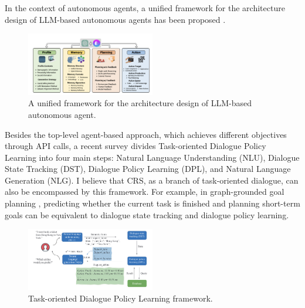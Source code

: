 \documentclass[11pt]{article}
\begin{document}
In the context of autonomous agents, a unified framework for the architecture design of LLM-based autonomous agents has been proposed \cite{wang2023survey}.
\begin{figure}[ht]
\centering
\includegraphics[width=0.5\textwidth]{images/image-20231224152952795.png}
\caption{A unified framework for the architecture design of LLM-based autonomous agent. \cite{wang2023survey}}
\end{figure}



Besides the top-level agent-based approach, which achieves different objectives through API calls, a recent survey \cite{kwanSurveyRecentAdvances2023} divides Task-oriented Dialogue Policy Learning into four main steps: Natural Language Understanding (NLU), Dialogue State Tracking (DST), Dialogue Policy Learning (DPL), and Natural Language Generation (NLG). I believe that CRS, as a branch of task-oriented dialogue, can also be encompassed by this framework. For example, in graph-grounded goal planning \citet{liuGraphGroundedGoalPlanning2022}, predicting whether the current task is finished and planning short-term goals can be equivalent to dialogue state tracking and dialogue policy learning.
\begin{figure}[ht]
\centering
\includegraphics[width=0.5\textwidth]{images/image-20231224150925950.png}
\caption{Task-oriented Dialogue Policy Learning framework. \citet{kwanSurveyRecentAdvances2023}}
\end{figure}
\end{document}
